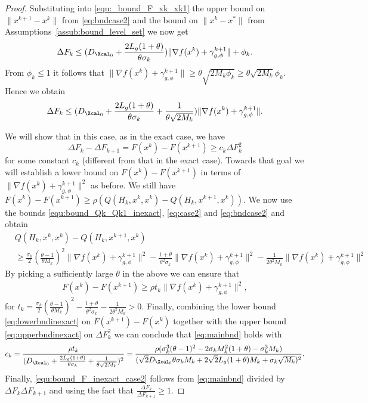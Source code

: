 \documentclass[11pt]{article}
\numberwithin{equation}{section}
\begin{document}
\begin{proof}
	Substituting into \eqref{equ:_bound_F_xk_xk1} the upper bound on  $\| x^{k+1} - x^k\|$ from \eqref{eq:bndcase2} and the bound on $\|x^{k} - x^*\|$ from Assumptions~\ref{assub:bound_level_set} we now get  
	\begin{align*}
		\Delta F_k\leq 
		(D_{\Xcal_0} + \frac{2L_g(1+\theta)}{\theta\sigma_k})\|\nabla f(x^k)+\gamma_{g, \phi}^{k+1}\| + \phi_k.
	\end{align*}
	From $ \phi_k \leq 1$ it follows that $\| \nabla f(x^k) + \gamma_{g, \phi}^{k+1} \| \geq \theta \sqrt{2M_k\phi_k} \geq \theta \sqrt{2M_k}\phi_k$. Hence we obtain
	\begin{align}
	\label{eq:upperbndinexact}
		\Delta F_k\leq 
		(D_{\Xcal_0} + \frac{2L_g(1+\theta)}{\theta\sigma_k} + \frac{1}{\theta\sqrt{2M_k}})\|\nabla f(x^k)+\gamma_{g, \phi}^{k+1}\|.
	\end{align}
	 
	We will  show that in this case, as in the exact case,  we have 
	\begin{equation}\label{eq:mainbnd}
		\Delta F_k - \Delta F_{k+1} = 
		 F(x^k) - F(x^{k+1})\geq c_k \Delta F_k^2
	\end{equation} for some constant $c_k$ (different from that in the exact case).  
	Towards that goal  we will establish a lower bound on $F(x^{k})-F(x^{k+1})$ in terms of $\|\nabla f(x^k)+\gamma_{g, \phi}^{k+1}\|^2$ as before.
	We still have $F(x^{k})-F(x^{k+1})\geq \rho (Q(H_k, x^{k}, x^k)-Q(H_k,x^{k+1}, x^k))$. 
	We now use the bounds \eqref{equ:bound_Qk_Qk1_inexact}, \eqref{eq:case2} and \eqref{eq:bndcase2} and obtain
	\begin{align*}
		&Q(H_k,x^k,x^k) - Q(H_k,x^{k+1}, x^k) \\
		&\geq \frac{\sigma_k}{2}(\frac{\theta-1}{\theta M_k})^2 \| \nabla f(x^k) + \gamma_{g, \phi}^{k+1} \|^2
		- \frac{1+\theta}{\theta^2\sigma_k}\| \nabla f(x^k) + \gamma_{g, \phi}^{k+1} \|^2 
		- \frac{1}{2\theta^2M_k}\| \nabla f(x^k) + \gamma_{g, \phi}^{k+1} \|^2
	\end{align*}
	By picking a sufficiently large $\theta$ in the above we can ensure that 
	\begin{align}
	\label{eq:lowerbndinexact}
	    F(x^k) - F(x^{k+1})\geq \rho t_k \| \nabla f(x^k) + \gamma_{g, \phi}^{k+1} \|^2,
	\end{align}
	for $t_k=\frac{\sigma_k}{2}(\frac{\theta-1}{\theta M_k})^2 - \frac{1+\theta}{\theta^2\sigma_k}- \frac{1}{2\theta^2M_k}>0$. 
	Finally, combining the lower bound \eqref{eq:lowerbndinexact} on $F(x^{k+1})-F(x^k)$ together with the upper bound \eqref{eq:upperbndinexact}
	on $\Delta F_k^2$  we can conclude that \eqref{eq:mainbnd} holds with 
	\begin{align*}
		c_k= \frac{\rho t_k}{(D_{\Xcal_0} + \frac{2L_g(1+\theta)}{\theta\sigma_k} + \frac{1}{\theta\sqrt{2M_k}})^2} = \frac{\rho(\sigma_k^3(\theta-1)^2 - 2\sigma_kM_k^2(1+\theta) - \sigma_k^3M_k )}{(\sqrt{2}D_{\Xcal_0}\theta\sigma_kM_k + 2\sqrt{2}L_g(1+\theta)M_k + \sigma_k\sqrt{M_k} )^2}.    
	\end{align*}
	Finally, \eqref{equ:bound_F_inexact_case2} follows from \eqref{eq:mainbnd} divided by $\Delta F_k\Delta F_{k+1}$ and using the fact that $\frac{\Delta F_k}{\Delta F_{k+1}} \geq 1$.
	

\end{proof}
\end{document}
